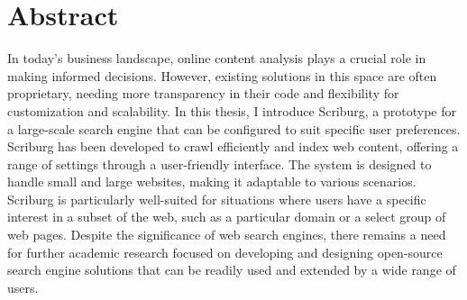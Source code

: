 \chapter*{Abstract}
In today's business landscape, online content analysis plays a crucial role in making informed decisions. However, existing solutions in this space are often proprietary, needing more transparency in their code and flexibility for customization and scalability. In this thesis, I introduce Scriburg, a prototype for a large-scale search engine that can be configured to suit specific user preferences. Scriburg has been developed to crawl efficiently and index web content, offering a range of settings through a user-friendly interface. The system is designed to handle small and large websites, making it adaptable to various scenarios. Scriburg is particularly well-suited for situations where users have a specific interest in a subset of the web, such as a particular domain or a select group of web pages. Despite the significance of web search engines, there remains a need for further academic research focused on developing and designing open-source search engine solutions that can be readily used and extended by a wide range of users.
